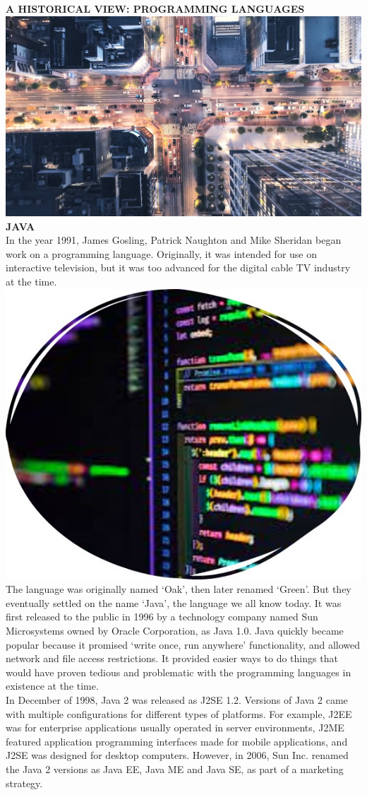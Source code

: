 \documentclass{article}
\begin{document}
	\textbf{A HISTORICAL VIEW: PROGRAMMING LANGUAGES}\\
	\includegraphics{picture8}
	\newpage
	\textbf{JAVA}\\
	In the year 1991, James Gosling, Patrick Naughton and Mike Sheridan began work on a programming language. Originally, it was intended for use on interactive television, but it was too advanced for the digital cable TV industry at the time.\\
	\includegraphics[width=0.5\linewidth]{picture100}\\
	The language was originally named ‘Oak’, then later renamed ‘Green’. But they eventually settled on the name ‘Java’, the language we all know today.
	It was first released to the public in 1996 by a technology company named Sun Microsystems owned by Oracle Corporation, as Java 1.0. 
	Java quickly became popular because it promised ‘write once, run anywhere’ functionality, and allowed network and file access restrictions. It provided easier ways to do things that would have proven tedious and problematic with the programming languages in existence at the time.\\
	In December of 1998, Java 2 was released as J2SE 1.2. Versions of Java 2 came with multiple configurations for different types of platforms. For example, J2EE was for enterprise applications usually operated in server environments, J2ME featured application programming interfaces made for mobile applications, and J2SE was designed for desktop computers. However, in 2006, Sun Inc. renamed the Java 2 versions as Java EE, Java ME and Java SE, as part of a marketing strategy.\\
\end{document}
